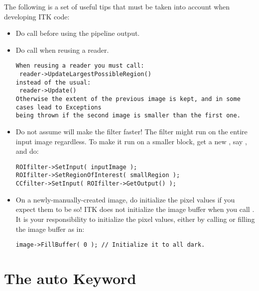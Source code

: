 The following is a set of useful tips that must be taken into account when
developing ITK code:
\begin{itemize}
\item Do call  before using the pipeline output.
\item Do call  when reusing a reader.

\small
\begin{verbatim}
When reusing a reader you must call:
 reader->UpdateLargestPossibleRegion()
instead of the usual:
 reader->Update()
Otherwise the extent of the previous image is kept, and in some cases lead to Exceptions
being thrown if the second image is smaller than the first one.
\end{verbatim}
\normalsize

\item Do not assume  will
make the filter faster! The filter might run on the entire input image
regardless. To make it run on a smaller block, get a new
, say , and do:

\small
\begin{verbatim}
ROIfilter->SetInput( inputImage );
ROIfilter->SetRegionOfInterest( smallRegion );
CCfilter->SetInput( ROIfilter->GetOutput() );
\end{verbatim}
\normalsize

\item On a newly-manually-created image, do initialize the pixel values if you
expect them to be so! ITK does not initialize the image buffer when you call
. It is your responsibility to initialize the pixel values,
either by calling  or filling the image buffer as in:

\small
\begin{verbatim}
image->FillBuffer( 0 ); // Initialize it to all dark.
\end{verbatim}
\normalsize

\end{itemize}

\section{The auto Keyword}
\label{sec:TheAutoKeyword}

